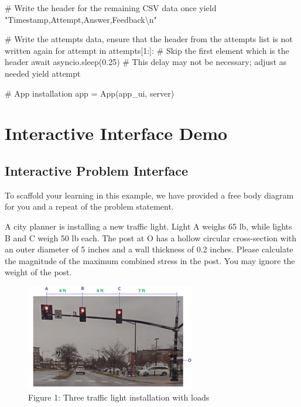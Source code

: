 \documentclass[
  letterpaper,
  DIV=11,
  numbers=noendperiod]{scrreprt}
\newenvironment{Shaded}{\begin{snugshade}}{\end{snugshade}}
\newcommand{\NormalTok}[1]{\textcolor[rgb]{0.00,0.23,0.31}{#1}}
\begin{document}
\begin{Shaded}
\begin{Highlighting}[]
\NormalTok{        \# Write the header for the remaining CSV data once}
\NormalTok{        yield "Timestamp,Attempt,Answer,Feedback\textbackslash{}n"}
        
\NormalTok{        \# Write the attempts data, ensure that the header from the attempts list is not written again}
\NormalTok{        for attempt in attempts[1:]:  \# Skip the first element which is the header}
\NormalTok{            await asyncio.sleep(0.25)  \# This delay may not be necessary; adjust as needed}
\NormalTok{            yield attempt}


\NormalTok{\# App installation}
\NormalTok{app = App(app\_ui, server)}
\end{Highlighting}
\end{Shaded}

\part{Interactive Interface Demo}

\chapter*{Interactive Problem
Interface}\label{interactive-problem-interface}


To scaffold your learning in this example, we have provided a free body
diagram for you and a repeat of the problem statement.

A city planner is installing a new traffic light. Light A weighs 65 lb,
while lights B and C weigh 50 lb each. The post at O has a hollow
circular cross-section with an outer diameter of 5 inches and a wall
thickness of 0.2 inches. Please calculate the magnitude of the maximum
combined stress in the post. You may ignore the weight of the post.

\begin{figure}[H]

{\centering \includegraphics{images/stoplights.png}

}

\caption{Figure 1: Three traffic light installation with loads}

\end{figure}%
\end{document}
